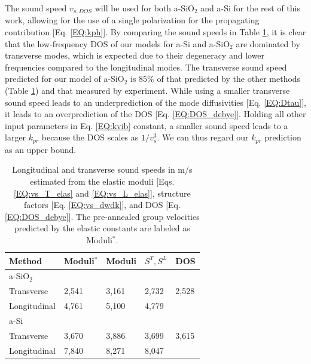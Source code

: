 \documentclass[aps,prb,onecolumn,preprint,superscriptaddress,footinbib,amsmath,amssymb,floatfix]{revtex4}
\begin{document}
The sound speed $v_{s,DOS}$ will be used for both 
a-SiO$_2$ and a-Si for the rest of this work, allowing 
for the use of a single polarization for the propagating 
contribution [Eq. \eqref{EQ:kph}]. 
By comparing the sound speeds in Table \ref{T:vs}, it is clear that 
the low-frequency DOS of our models for a-Si and a-SiO$_2$ are 
dominated by 
transverse modes, which is expected due to their degeneracy and lower 
frequencies compared to the longitudinal modes.  
The transverse sound speed predicted for our model of 
a-SiO$_2$ is $85\%$ of that predicted by 
the other methods (Table \ref{T:vs}) and that measured by experiment.
\cite{vacher_ultrasonic_1981,benassi_evidence_1996,
ruocco_high-frequency_2001,polian_elastic_2002,
ruzicka_evidence_2004} 
While using a smaller transverse sound speed 
leads to an underprediction of the
mode diffusivities [Eq. \eqref{EQ:Dtau}], it leads to an
overprediction of the DOS [Eq. \eqref{EQ:DOS_debye}]. 
Holding all other input parameters in Eq. \eqref{EQ:kvib} constant,
a smaller sound speed leads to a larger $k_{pr}$ 
because the DOS scales as $1/v^3_{s}$. We can thus regard
our $k­_{pr}$ prediction as an upper bound.

\begin{center}
\begingroup
\begin{table}
\caption{\label{T:vs}
Longitudinal and transverse sound speeds in m/s estimated from the 
elastic moduli [Eqs. \eqref{EQ:vs_T_elas} and \eqref{EQ:vs_L_elas}], 
structure factors [Eq. \eqref{EQ:vs_dwdk}], and 
DOS [Eq. \eqref{EQ:DOS_debye}]. The pre-annealed group velocities 
predicted by the elastic constants are labeled as Moduli$^*$.}
\begin{tabular}{lllll}
\hline \hline
Method & Moduli$^*$ & Moduli & $S^{T}, S^{L}$ & DOS \\
\hline
a-SiO$_2$ \\
\hline
Transverse & 2,541 & 3,161 & 2,732 & 2,528  \\
Longitudinal & 4,761 & 5,100 & 4,779 &  \\
\hline
a-Si \\
\hline
Transverse & 3,670 & 3,886 & 3,699 & 3,615 \\
Longitudinal & 7,840 & 8,271 & 8,047 & \\
\hline \hline
\end{tabular}
\end{table}
\endgroup
\end{center}
\vspace{10mm}
\end{document}
